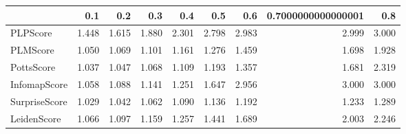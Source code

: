 \begin{tabular}{lrrrrrrrr}
\toprule
{} &   0.1 &   0.2 &   0.3 &   0.4 &   0.5 &   0.6 & 0.7000000000000001 &   0.8 \\
\midrule
PLPScore      & 1.448 & 1.615 & 1.880 & 2.301 & 2.798 & 2.983 &              2.999 & 3.000 \\
PLMScore      & 1.050 & 1.069 & 1.101 & 1.161 & 1.276 & 1.459 &              1.698 & 1.928 \\
PottsScore    & 1.037 & 1.047 & 1.068 & 1.109 & 1.193 & 1.357 &              1.681 & 2.319 \\
InfomapScore  & 1.058 & 1.088 & 1.141 & 1.251 & 1.647 & 2.956 &              3.000 & 3.000 \\
SurpriseScore & 1.029 & 1.042 & 1.062 & 1.090 & 1.136 & 1.192 &              1.233 & 1.289 \\
LeidenScore   & 1.066 & 1.097 & 1.159 & 1.257 & 1.441 & 1.689 &              2.003 & 2.246 \\
\bottomrule
\end{tabular}
